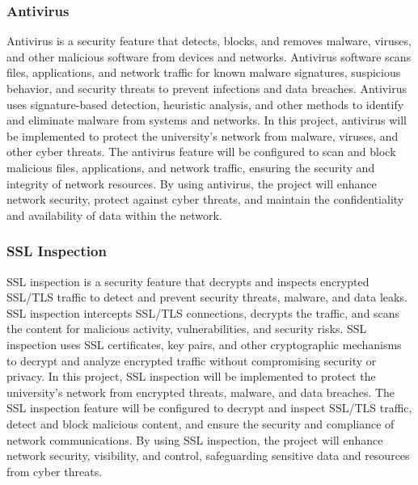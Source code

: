 \documentclass[12pt]{report}
\begin{document}
\subsubsection{Antivirus}
Antivirus is a security feature that detects, blocks, and removes malware, viruses, and other malicious software from devices and networks. Antivirus software scans files, applications, and network traffic for known malware signatures, suspicious behavior, and security threats to prevent infections and data breaches. Antivirus uses signature-based detection, heuristic analysis, and other methods to identify and eliminate malware from systems and networks. In this project, antivirus will be implemented to protect the university's network from malware, viruses, and other cyber threats. The antivirus feature will be configured to scan and block malicious files, applications, and network traffic, ensuring the security and integrity of network resources. By using antivirus, the project will enhance network security, protect against cyber threats, and maintain the confidentiality and availability of data within the network. %
\subsubsection{SSL Inspection}
SSL inspection is a security feature that decrypts and inspects encrypted SSL/TLS traffic to detect and prevent security threats, malware, and data leaks. SSL inspection intercepts SSL/TLS connections, decrypts the traffic, and scans the content for malicious activity, vulnerabilities, and security risks. SSL inspection uses SSL certificates, key pairs, and other cryptographic mechanisms to decrypt and analyze encrypted traffic without compromising security or privacy. In this project, SSL inspection will be implemented to protect the university's network from encrypted threats, malware, and data breaches. The SSL inspection feature will be configured to decrypt and inspect SSL/TLS traffic, detect and block malicious content, and ensure the security and compliance of network communications. By using SSL inspection, the project will enhance network security, visibility, and control, safeguarding sensitive data and resources from cyber threats. %
\end{document}
